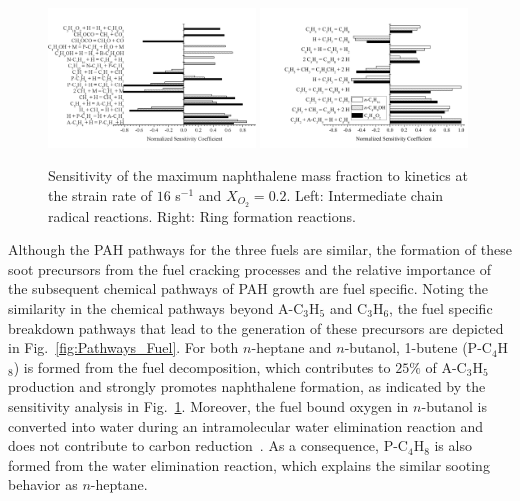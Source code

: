 \documentclass[review,3p,times]{elsarticleUS}
\begin{document}
\begin{figure}[t]
  \centering
  \scriptsize
  \includegraphics[trim=0mm 0mm 0mm 8mm, clip=true,width=0.49\textwidth]{Chain.png}
  \includegraphics[trim=0mm 0mm 0mm 8mm, clip=true,width=0.49\textwidth]{Ring.png}
  \normalsize
  \vspace{-0.2in}
  \caption{Sensitivity of the maximum naphthalene mass fraction to kinetics at the strain rate of $16$ s$^{-1}$ and $X_{O_2}=0.2$. Left: Intermediate chain radical reactions. Right: Ring formation reactions.}
  \label{fig:SA4}
\end{figure}

Although the PAH pathways for the three fuels are similar, the formation of these soot precursors from the fuel cracking processes and the relative importance of the subsequent chemical pathways of PAH growth are fuel specific. Noting the similarity in the chemical pathways beyond A-C$_3$H$_5$ and C$_3$H$_6$, the fuel specific breakdown pathways that lead to the generation of these precursors are depicted in Fig.~\ref{fig:Pathways_Fuel}. For both $n$-heptane and $n$-butanol, 1-butene (P-C$_4$H$_8$) is formed from the fuel decomposition, which contributes to $25\%$ of A-C$_3$H$_5$ production and strongly promotes naphthalene formation, as indicated by the sensitivity analysis in Fig.~\ref{fig:SA4}. Moreover, the fuel bound oxygen in $n$-butanol is converted into water during an intramolecular water elimination reaction and does not contribute to carbon reduction~\cite{mcenally05,mcenally11}.  As a consequence, P-C$_4$H$_8$ is also formed from the water elimination reaction, which explains the similar sooting behavior as $n$-heptane.
\end{document}
